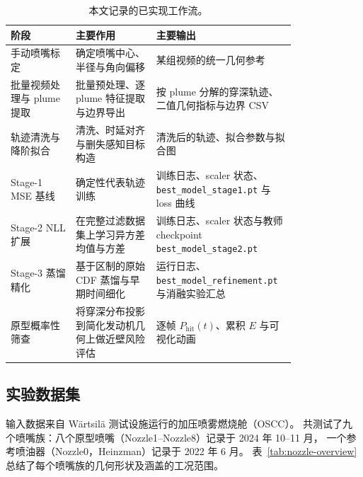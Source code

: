 \documentclass[english, 12pt, a4paper, elec, utf8, a-2b, online]{aaltothesis}
\DeclareRobustCommand{\codepath}[1]{\nolinkurl{#1}}
\begin{document}
\begin{CJK*}{UTF8}{gbsn}
\begin{table}[t]
\centering
\begin{tabular}{|L{0.21\linewidth}|L{0.26\linewidth}|L{0.33\linewidth}|}
\hline
阶段 & 主要作用 & 主要输出 \\
\hline
手动喷嘴标定 & 确定喷嘴中心、半径与角向偏移 & 某组视频的统一几何参考 \\
\hline
批量视频处理与 plume 提取 & 批量预处理、逐 plume 特征提取与边界导出 & 按 plume 分解的穿深轨迹、二值几何指标与边界 CSV \\
\hline
轨迹清洗与降阶拟合 & 清洗、时延对齐与删失感知目标构造 & 清洗后的轨迹、拟合参数与拟合图 \\
\hline
Stage-1 MSE 基线 & 确定性代表轨迹训练 & 训练日志、scaler 状态、\codepath{best_model_stage1.pt} 与 loss 曲线 \\
\hline
Stage-2 NLL 扩展 & 在完整过滤数据集上学习异方差均值与方差 & 训练日志、scaler 状态与教师 checkpoint \codepath{best_model_stage2.pt} \\
\hline
Stage-3 蒸馏精化 & 基于区制的原始 CDF 蒸馏与早期时间细化 & 运行日志、\codepath{best_model_refinement.pt} 与消融实验汇总 \\
\hline
原型概率性筛查 & 将穿深分布投影到简化发动机几何上做近壁风险评估 & 逐帧 $P_{\mathrm{hit}}(t)$、累积 $E$ 与可视化动画 \\
\hline
\end{tabular}
\caption{本文记录的已实现工作流。}
\label{tab:workflow}
\end{table}

\subsection{实验数据集}

输入数据来自 Wärtsilä 测试设施运行的加压喷雾燃烧舱（OSCC）。
共测试了九个喷嘴族：八个原型喷嘴（Nozzle1--Nozzle8）记录于 2024 年 10--11 月，
一个参考喷油器（Nozzle0，Heinzman）记录于 2022 年 6 月。
表~\ref{tab:nozzle-overview} 总结了每个喷嘴族的几何形状及涵盖的工况范围。


\end{CJK*}
\end{document}
